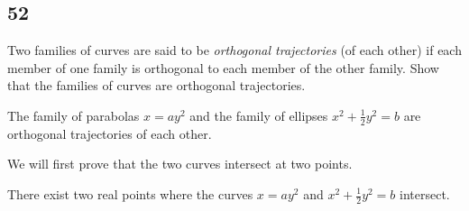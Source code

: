 \documentclass[../hw3.tex]{subfiles}
\begin{document}
\subsection*{52}

Two families of curves are said to be \textit{orthogonal trajectories} (of
each other) if each member of one family is orthogonal to each
member of the other family. Show that the families of curves are orthogonal trajectories.

The family of parabolas $x = ay^2$ and the family of ellipses $x^2+\frac{1}{2}y^2 = b$ are orthogonal trajectories of each other.


We will first prove that the two curves intersect at two points.

\begin{proposition}
    There exist two real points where the curves $x=ay^2$ and $x^2+\frac{1}{2}y^2 = b$ intersect.
\end{proposition}
\end{document}
